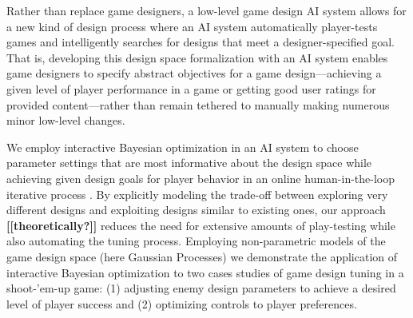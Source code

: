 \documentclass[letterpaper]{article}
\newcommand{\mytodo}[1]{\textbf{[[#1]]}}
\begin{document}
Rather than replace game designers, a low-level game design AI system allows for a new kind of design process where an AI system automatically player-tests games and intelligently searches for designs that meet a designer-specified goal. 
That is, developing this design space formalization with an AI system enables game designers to specify abstract objectives for a game design---achieving a given level of player performance in a game or getting good user ratings for provided content---rather than remain tethered to manually making numerous minor low-level changes.




We employ interactive Bayesian optimization in an AI system to choose parameter settings that are most informative about the design space while achieving given design goals for player behavior in an online human-in-the-loop iterative process \cite{brochu2010:thesis}. By explicitly modeling the trade-off between exploring very different designs and exploiting designs similar to existing ones, our approach \mytodo{theoretically?} reduces the need for extensive amounts of play-testing while also automating the tuning process.
Employing non-parametric models of the game design space (here Gaussian Processes) we demonstrate the application of interactive Bayesian optimization to two cases studies of game design tuning in a shoot-'em-up game: (1) adjusting enemy design parameters to achieve a desired level of player success and (2) optimizing controls to player preferences.
\end{document}
